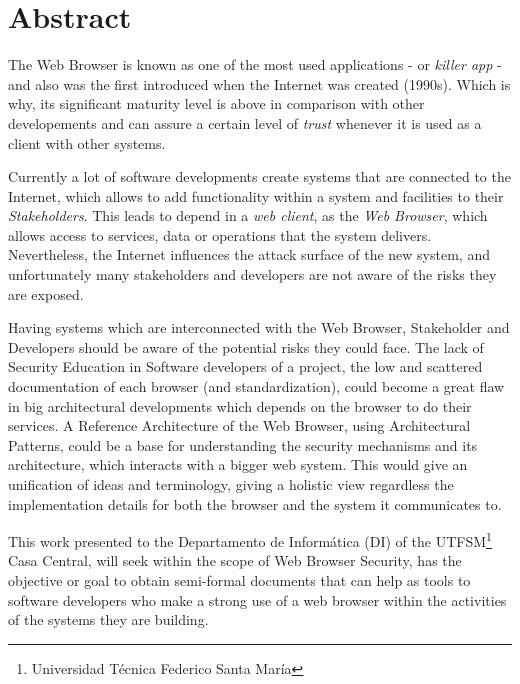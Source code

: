\section*{Abstract}

The Web Browser is known as one of the most used applications - or \textit{killer app} - and also was the first introduced when the Internet was created (1990s). Which is why, its significant maturity level is above in comparison with other developements and can assure a certain level of \textit{trust} whenever it is used as a client with other systems.

Currently a lot of software developments create systems that are connected to the Internet, which allows to add functionality within a system and facilities to their \textit{Stakeholders}. This leads to depend in a \textit{web client}, as the \textit{Web Browser}, which allows access to services, data or operations that the system delivers. Nevertheless, the Internet influences the attack surface of the new system, and unfortunately many stakeholders and developers are not aware of the risks they are exposed.

Having systems which are interconnected with the Web Browser, Stakeholder and Developers should be aware of the potential risks they could face. The lack of Security Education in Software developers of a project, the low and scattered documentation of each browser (and standardization), could become a great flaw in big architectural developments which depends on the browser to do their services. A Reference Architecture of the Web Browser, using Architectural Patterns, could be a base for understanding the security mechanisms and its architecture, which interacts with a bigger web system. This would give an unification of ideas and terminology, giving a holistic view regardless the implementation details for both the browser and the system it communicates to.

This work presented to the Departamento de Informática (DI) of the UTFSM\footnote{Universidad Técnica Federico Santa María} Casa Central, will seek within the scope of Web Browser Security, has the objective or goal to obtain semi-formal documents that can help as tools to software developers who make a strong use of a web browser within the activities of the systems they are building.



\label{chap:abstract}


